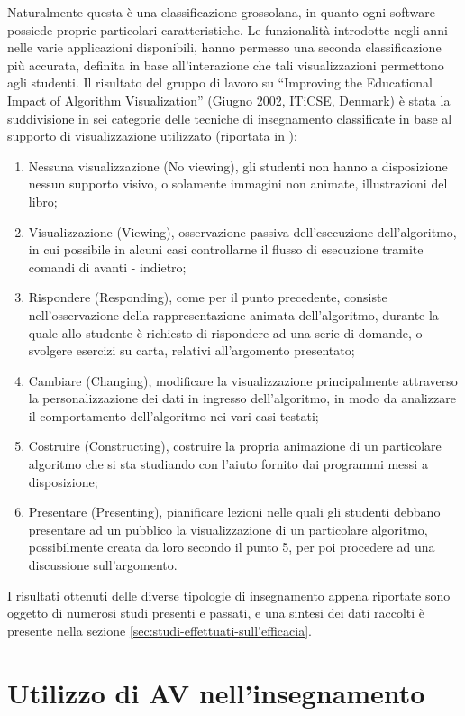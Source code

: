 Naturalmente questa è una classificazione grossolana, in quanto ogni
software possiede proprie particolari caratteristiche. Le funzionalità
introdotte negli anni nelle varie applicazioni disponibili, hanno
permesso una seconda classificazione più accurata, definita in base
all'interazione che tali visualizzazioni permettono agli studenti.
Il risultato del gruppo di lavoro su {}``Improving the Educational
Impact of Algorithm Visualization'' (Giugno 2002, ITiCSE, Denmark)
è stata la suddivisione in sei categorie delle tecniche di insegnamento
classificate in base al supporto di visualizzazione utilizzato (riportata
in \cite{AV-compare}): 
\begin{enumerate}
\item Nessuna visualizzazione (No viewing), gli studenti non hanno a disposizione
nessun supporto visivo, o solamente immagini non animate, illustrazioni
del libro;
\item Visualizzazione (Viewing), osservazione passiva dell'esecuzione dell'algoritmo,
in cui possibile in alcuni casi controllarne il flusso di esecuzione
tramite comandi di avanti - indietro;
\item Rispondere (Responding), come per il punto precedente, consiste nell'osservazione
della rappresentazione animata dell'algoritmo, durante la quale allo
studente è richiesto di rispondere ad una serie di domande, o svolgere
esercizi su carta, relativi all'argomento presentato;
\item Cambiare (Changing), modificare la visualizzazione principalmente
attraverso la personalizzazione dei dati in ingresso dell'algoritmo,
in modo da analizzare il comportamento dell'algoritmo nei vari casi
testati;
\item Costruire (Constructing), costruire la propria animazione di un particolare
algoritmo che si sta studiando con l'aiuto fornito dai programmi messi
a disposizione;
\item Presentare (Presenting), pianificare lezioni nelle quali gli studenti
debbano presentare ad un pubblico la visualizzazione di un particolare
algoritmo, possibilmente creata da loro secondo il punto 5, per poi
procedere ad una discussione sull'argomento. 
\end{enumerate}
I risultati ottenuti delle diverse tipologie di insegnamento appena
riportate sono oggetto di numerosi studi presenti e passati, e una
sintesi dei dati raccolti è presente nella sezione \ref{sec:studi-effettuati-sull'efficacia}.


\section{\label{sec:studi-effettuati-sull'efficacia}Utilizzo di AV nell'insegnamento}

